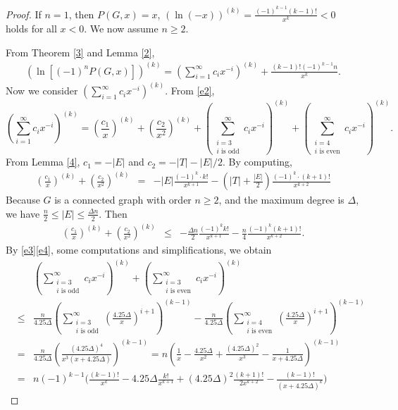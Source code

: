 \documentclass[12pt]{article}
\theoremstyle{definition}
\begin{document}
\begin{proof} If $n=1$, then $P(G,x)=x$, $(\ln(-x))^{(k)}=\frac{(-1)^{k-1}(k-1)!}{x^k}<0$ holds for all $x<0$. We now assume $n\geq 2$.

From Theorem \ref{3} and Lemma \ref{2},
\begin{eqnarray}\label{e0}(\ln[(-1)^n P(G, x)])^{(k)}=(\sum\limits_{i=1}^\infty c_i x^{-i})^{(k)}+\frac{(k-1)!(-1)^{k-1}n}{x^{k}}.\end{eqnarray}
Now we consider $(\sum\limits_{i=1}^\infty c_i x^{-i})^{(k)}$. From \eqref{e2},
$$(\sum\limits_{i=1}^\infty c_i x^{-i})^{(k)}=(\frac{c_1}{x})^{(k)}+(\frac{c_2}{x^2})^{(k)}+(\sum\limits_{\substack{ i =3\\ \text{$i$ is odd}}}^\infty c_i x^{-i})^{(k)}+(\sum\limits_{\substack{ i =4\\ \text{$i$ is even}}}^\infty c_i x^{-i})^{(k)}.$$
From Lemma \ref{4}, $c_1=-|E|$ and $c_2=-|T|-|E|/2.$ By computing, \begin{eqnarray*}(\frac{c_1}{x})^{(k)}+(\frac{c_2}{x^2})^{(k)}&=&-|E| \frac{(-1)^{k} \cdot k!}{x^{k+1}} - (|T|+\frac{|E|}{2}) \frac{(-1)^{k} \cdot (k+1)!}{x^{k+2}}\end{eqnarray*}
Because $G$ is a connected graph with order $n\geq 2$, and the maximum degree is $\Delta$,  we have $\frac{n}{2}\leq |E|\leq\frac{\Delta n}{2}$. Then
\begin{eqnarray}\label{e5}(\frac{c_1}{x})^{(k)}+(\frac{c_2}{x^2})^{(k)}&\leq &-\frac{\Delta n}{2} \frac{(-1)^{k}k!}{x^{k+1}} - \frac{n}{4} \frac{(-1)^{k} (k+1)!}{x^{k+2}}.\end{eqnarray}
By \eqref{e3}\eqref{e4}, some computations and simplifications, we obtain
\begin{eqnarray}\label{e6}
&&(\sum\limits_{\substack{ i =3\\ \text{$i$ is odd}}}^\infty c_i x^{-i})^{(k)}+(\sum\limits_{\substack{ i =3\\ \text{$i$ is even}}}^\infty c_i x^{-i})^{(k)}\nonumber\\
&\leq& \frac{n}{4.25\Delta}(\sum_{\substack{i=3 \\ i \text{ is odd}}}^{\infty}(\frac{4.25\Delta}{x})^{i+1})^{(k-1)}-\frac{n}{4.25\Delta}(\sum_{\substack{i=4 \\ i \text{ is even}}}^{\infty}(\frac{4.25\Delta}{x})^{i+1})^{(k-1)}\nonumber\\
&=& \frac{n}{4.25\Delta}(\frac{(4.25\Delta)^4}{x^3(x+4.25\Delta)})^{(k-1)}=n(\frac{1}{x}-\frac{4.25\Delta}{x^2}+\frac{(4.25\Delta)^2}{x^3}-\frac{1}{x+4.25\Delta})^{(k-1)}\nonumber\\
&=&n(-1)^{k-1}\Big(\frac{(k-1)!}{x^{k}}-4.25\Delta \frac{k!}{x^{k+1}} + (4.25\Delta)^{2}\frac{(k+1)!}{2x^{k+2}}-\frac{(k-1)!}{(x+4.25\Delta)^{k}}\Big)
\end{eqnarray}


\end{proof}
\end{document}
